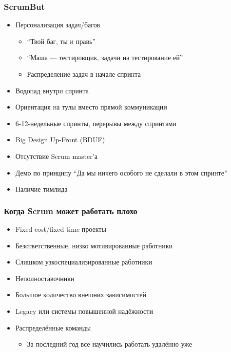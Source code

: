 \documentclass{../../slides-style}
\begin{document}
    \begin{frame}
        \frametitle{ScrumBut}
        \begin{itemize}
            \item Персонализация задач/багов
            \begin{itemize}
                \item ``Твой баг, ты и правь''
                \item ``Маша --- тестировщик, задачи на тестирование ей''
                \item Распределение задач в начале спринта
            \end{itemize}
            \item Водопад внутри спринта
            \item Ориентация на тулы вместо прямой коммуникации
            \item 6-12-недельные спринты, перерывы между спринтами
            \item Big Design Up-Front (BDUF)
            \item Отсутствие Scrum master’а
            \item Демо по принципу ``Да мы ничего особого не сделали в этом спринте''
            \item Наличие тимлида
        \end{itemize}
    \end{frame}

    \begin{frame}
        \frametitle{Когда Scrum может работать плохо}
        \begin{itemize}
            \item Fixed-cost/fixed-time проекты
            \item Безответственные, низко мотивированные работники
            \item Слишком узкоспециализированные работники
            \item Неполноставочники
            \item Большое количество внешних зависимостей
            \item Legacy или системы повышенной надёжности
            \item Распределённые команды 
            \begin{itemize}
                \item За последний год все научились работать удалённо уже
            \end{itemize}
        \end{itemize}
    \end{frame}
\end{document}
